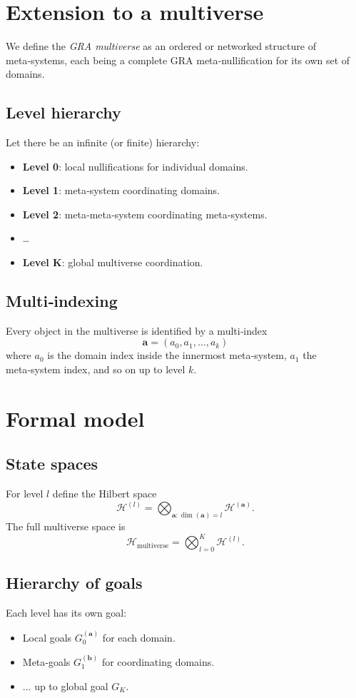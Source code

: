 \documentclass[12pt]{article}
\theoremstyle{definition}
\begin{document}
\section{Extension to a multiverse}
\label{sec:multiverse}

We define the \emph{GRA multiverse} as an ordered or networked structure of meta‑systems, each being a complete GRA meta‑nullification for its own set of domains.

\subsection{Level hierarchy}
Let there be an infinite (or finite) hierarchy:
\begin{itemize}
    \item \textbf{Level 0}: local nullifications for individual domains.
    \item \textbf{Level 1}: meta‑system coordinating domains.
    \item \textbf{Level 2}: meta‑meta‑system coordinating meta‑systems.
    \item \ldots
    \item \textbf{Level K}: global multiverse coordination.
\end{itemize}

\subsection{Multi‑indexing}
Every object in the multiverse is identified by a multi‑index
\[
\mathbf{a} = (a_0, a_1, \dots, a_k)
\]
where \(a_0\) is the domain index inside the innermost meta‑system, \(a_1\) the meta‑system index, and so on up to level \(k\).

\section{Formal model}
\label{sec:model}

\subsection{State spaces}
For level \(l\) define the Hilbert space
\[
\mathcal{H}^{(l)} = \bigotimes_{\mathbf{a}:\dim(\mathbf{a})=l} \mathcal{H}^{(\mathbf{a})}.
\]
The full multiverse space is
\[
\mathcal{H}_{\text{multiverse}} = \bigotimes_{l=0}^K \mathcal{H}^{(l)}.
\]

\subsection{Hierarchy of goals}
Each level has its own goal:
\begin{itemize}
    \item Local goals \(G_0^{(\mathbf{a})}\) for each domain.
    \item Meta‑goals \(G_1^{(\mathbf{b})}\) for coordinating domains.
    \item ... up to global goal \(G_K\).
\end{itemize}
\end{document}
